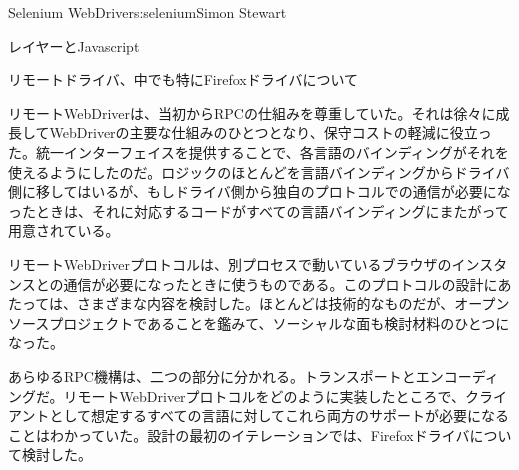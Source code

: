 \begin{aosachapter}{Selenium WebDriver}{s:selenium}{Simon Stewart}
\begin{aosasect1}{レイヤーとJavascript}
\end{aosasect1}

\begin{aosasect1}{リモートドライバ、中でも特にFirefoxドライバについて}

リモートWebDriverは、当初からRPCの仕組みを尊重していた。それは徐々に成長してWebDriverの主要な仕組みのひとつとなり、保守コストの軽減に役立った。統一インターフェイスを提供することで、各言語のバインディングがそれを使えるようにしたのだ。ロジックのほとんどを言語バインディングからドライバ側に移してはいるが、もしドライバ側から独自のプロトコルでの通信が必要になったときは、それに対応するコードがすべての言語バインディングにまたがって用意されている。

リモートWebDriverプロトコルは、別プロセスで動いているブラウザのインスタンスとの通信が必要になったときに使うものである。このプロトコルの設計にあたっては、さまざまな内容を検討した。ほとんどは技術的なものだが、オープンソースプロジェクトであることを鑑みて、ソーシャルな面も検討材料のひとつになった。

あらゆるRPC機構は、二つの部分に分かれる。トランスポートとエンコーディングだ。リモートWebDriverプロトコルをどのように実装したところで、クライアントとして想定するすべての言語に対してこれら両方のサポートが必要になることはわかっていた。設計の最初のイテレーションでは、Firefoxドライバについて検討した。


\end{aosasect1}
\end{aosachapter}
